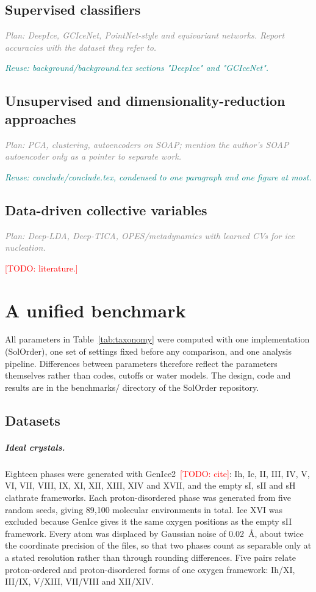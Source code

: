 \documentclass{template1}
\newcommand{\plan}[1]{\par\noindent\textcolor{gray}{\textit{Plan: #1}}\par}
\newcommand{\reuse}[1]{\par\noindent\textcolor{teal}{\textit{Reuse: #1}}\par}
\newcommand{\todo}[1]{\textcolor{red}{[TODO: #1]}}
\begin{document}
\section{Supervised classifiers}
\plan{DeepIce, GCIceNet, PointNet-style and equivariant networks. Report
accuracies with the dataset they refer to.}
\reuse{background/background.tex sections "DeepIce" and "GCIceNet".}

\section{Unsupervised and dimensionality-reduction approaches}
\plan{PCA, clustering, autoencoders on SOAP; mention the author's SOAP
autoencoder only as a pointer to separate work.}
\reuse{conclude/conclude.tex, condensed to one paragraph and one figure at
most.}

\section{Data-driven collective variables}
\plan{Deep-LDA, Deep-TICA, OPES/metadynamics with learned CVs for ice
nucleation.}
\todo{literature.}

\chapter{A unified benchmark}\label{ch:benchmark}
All parameters in Table~\ref{tab:taxonomy} were computed with one
implementation (SolOrder), one set of settings fixed before any comparison,
and one analysis pipeline. Differences between parameters therefore reflect
the parameters themselves rather than codes, cutoffs or water models. The
design, code and results are in the benchmarks/ directory of the SolOrder
repository.

\section{Datasets}\label{sec:datasets}
\paragraph{Ideal crystals.} Eighteen phases were generated with
GenIce2~\todo{cite}: Ih, Ic, II, III, IV, V, VI, VII, VIII, IX, XI, XII,
XIII, XIV and XVII, and the empty sI, sII and sH clathrate frameworks. Each
proton-disordered phase was generated from five random seeds, giving 89,100
molecular environments in total. Ice XVI was excluded because GenIce gives it
the same oxygen positions as the empty sII framework. Every atom was
displaced by Gaussian noise of 0.02~\AA, about twice the coordinate precision
of the files, so that two phases count as separable only at a stated
resolution rather than through rounding differences. Five pairs relate
proton-ordered and proton-disordered forms of one oxygen framework: Ih/XI,
III/IX, V/XIII, VII/VIII and XII/XIV.
\end{document}
